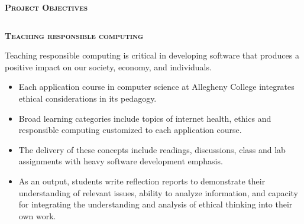 \documentclass[final,t]{beamer}
\begin{document}
\begin{frame}{}
\begin{columns}[t]
\begin{column}{1\linewidth}
\begin{block}{\textsc{\textbf{Project Objectives}}}
\begin{itemize}
				\end{itemize}

                    \vspace*{6mm}
                \end{block}
			\end{column}
		\end{columns}


		\begin{columns}

%
%
            \begin{column}{.5\linewidth}
%
%
			\begin{block}{\textsc{\textbf{Teaching responsible computing}}}
				\vspace*{3mm}

Teaching responsible computing is critical in developing software that produces a positive impact on our society, economy, and individuals.
				\begin{itemize}
					\item  Each application course in computer science at Allegheny College integrates ethical considerations in its pedagogy.
					\item Broad learning categories include topics of internet health, ethics and responsible computing customized to each application course. 
					\item The delivery of these concepts include readings,  discussions, class and lab assignments with heavy software development emphasis. 
					\item As an output, students  write reflection reports to demonstrate their understanding of relevant issues,  ability to analyze information, and  capacity for integrating the understanding and analysis of ethical thinking into their own work.
				\end{itemize}
				\vspace*{2mm}
			\end{block}
%
%




\end{column}
\end{columns}
\end{frame}
\end{document}
